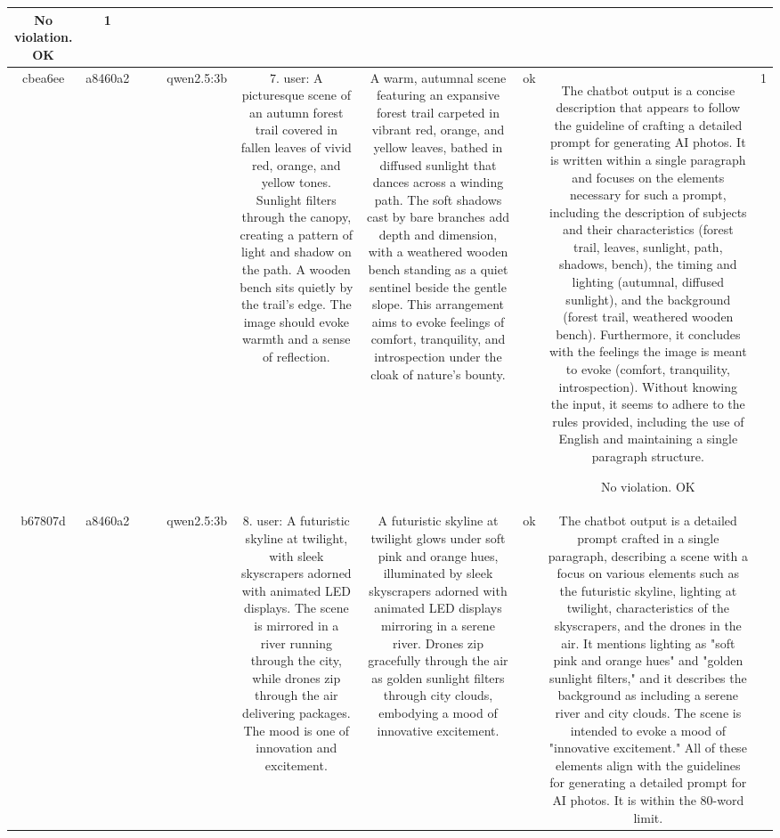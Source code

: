 \begin{table}[h!]
\begin{tabular}{|c|c|c|c|c|c|c|c|c|c|}
No violation.
OK & 1\\
\hline
cbea6ee & a8460a2 &  &  & qwen2.5:3b & 7. user: A picturesque scene of an autumn forest trail covered in fallen leaves of vivid red, orange, and yellow tones. Sunlight filters through the canopy, creating a pattern of light and shadow on the path. A wooden bench sits quietly by the trail's edge. The image should evoke warmth and a sense of reflection. & A warm, autumnal scene featuring an expansive forest trail carpeted in vibrant red, orange, and yellow leaves, bathed in diffused sunlight that dances across a winding path. The soft shadows cast by bare branches add depth and dimension, with a weathered wooden bench standing as a quiet sentinel beside the gentle slope. This arrangement aims to evoke feelings of comfort, tranquility, and introspection under the cloak of nature's bounty. & ok & The chatbot output is a concise description that appears to follow the guideline of crafting a detailed prompt for generating AI photos. It is written within a single paragraph and focuses on the elements necessary for such a prompt, including the description of subjects and their characteristics (forest trail, leaves, sunlight, path, shadows, bench), the timing and lighting (autumnal, diffused sunlight), and the background (forest trail, weathered wooden bench). Furthermore, it concludes with the feelings the image is meant to evoke (comfort, tranquility, introspection). Without knowing the input, it seems to adhere to the rules provided, including the use of English and maintaining a single paragraph structure.

No violation.
OK & 1\\
\hline
b67807d & a8460a2 &  &  & qwen2.5:3b & 8. user: A futuristic skyline at twilight, with sleek skyscrapers adorned with animated LED displays. The scene is mirrored in a river running through the city, while drones zip through the air delivering packages. The mood is one of innovation and excitement. & A futuristic skyline at twilight glows under soft pink and orange hues, illuminated by sleek skyscrapers adorned with animated LED displays mirroring in a serene river. Drones zip gracefully through the air as golden sunlight filters through city clouds, embodying a mood of innovative excitement. & ok & The chatbot output is a detailed prompt crafted in a single paragraph, describing a scene with a focus on various elements such as the futuristic skyline, lighting at twilight, characteristics of the skyscrapers, and the drones in the air. It mentions lighting as "soft pink and orange hues" and "golden sunlight filters," and it describes the background as including a serene river and city clouds. The scene is intended to evoke a mood of "innovative excitement." All of these elements align with the guidelines for generating a detailed prompt for AI photos. It is within the 80-word limit. 


\end{tabular}
\end{table}
